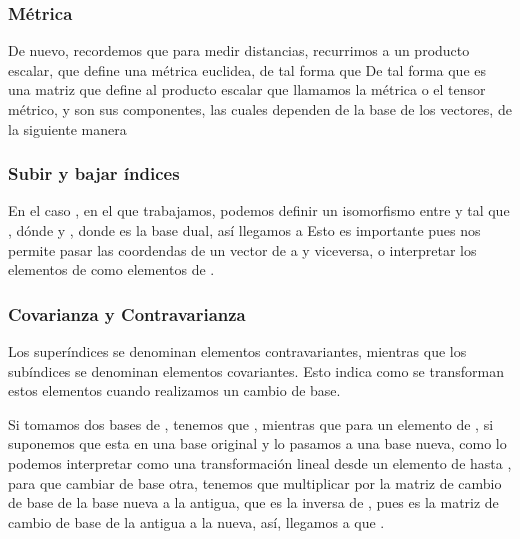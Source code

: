 \subsubsection{Métrica}
De nuevo, recordemos que para medir distancias, recurrimos a un producto escalar, que define una métrica euclidea, de tal forma que
De tal forma que  es una matriz que define al producto escalar que llamamos la métrica o el tensor métrico, y  son sus componentes, las cuales dependen de la base de los vectores, de la siguiente manera
\vspace{-35pt}
\subsubsection{Subir y bajar índices}
En el caso \lrg{$\R$}, en el que trabajamos, podemos definir un isomorfismo entre  y  tal que , dónde  y , donde  es la base dual, así llegamos a
Esto es importante pues nos permite pasar las coordendas de un vector de  a  y viceversa, o interpretar los elementos de  como elementos de .
\subsubsection{Covarianza y Contravarianza}
Los superíndices se denominan elementos contravariantes, mientras que los subíndices se denominan elementos covariantes. Esto indica como se transforman estos elementos cuando realizamos un cambio de base.

Si tomamos dos bases de , tenemos que , mientras que para un elemento de , si suponemos que esta en una base original y lo pasamos a una base nueva, como lo podemos interpretar como una transformación lineal desde un elemento de  hasta \lrg{$\R$}, para que cambiar de base otra, tenemos que multiplicar por la matriz de cambio de base de la base nueva a la antigua, que es la inversa de , pues  es la matriz de cambio de base de la antigua a la nueva, así, llegamos a que .

